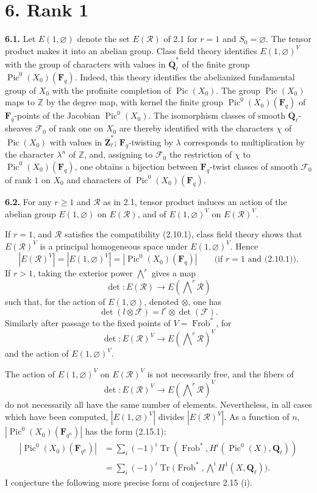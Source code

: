 \documentclass[11pt]{article}
\newcommand{\Fq}{\mathbf{F}_q}
\newcommand{\F}{\mathbf{F}}
\newcommand{\Qbl}{\overline{\mathbf{Q}}_{\ell}}
\newcommand{\Ql}{\mathbf{Q}_{\ell}}
\newcommand{\Zbl}{\overline{\mathbf{Z}}_{\ell}}
\newcommand{\Frob}{\operatorname{Frob}}
\newcommand{\Pic}{\operatorname{Pic}}
\newcommand{\Tr}{\operatorname{Tr}}
\newcommand{\Z}{\mathbb{Z}}
\newcommand{\para}[1]{\medskip\noindent\textbf{#1}\enspace}
\begin{document}
\section*{6. Rank 1}

\para{6.1.} Let \(E(1,\varnothing)\) denote the set \(E(\mathcal R)\) of 2.1 for \(r=1\) and \(S_0=\varnothing\). The tensor product makes it into an abelian group. Class field theory identifies \(E(1,\varnothing)^V\) with the group of characters with values in \(\Qbl^*\) of the finite group \(\Pic^0(X_0)(\Fq)\). Indeed, this theory identifies the abelianized fundamental group of \(X_0\) with the profinite completion of \(\Pic(X_0)\). The group \(\Pic(X_0)\) maps to \(\Z\) by the degree map, with kernel the finite group \(\Pic^0(X_0)(\Fq)\) of \(\Fq\)-points of the Jacobian \(\Pic^0(X_0)\). The isomorphism classes of smooth \(\Qbl\)-sheaves \(\mathcal F_0\) of rank one on \(X_0\) are thereby identified with the characters \(\chi\) of \(\Pic(X_0)\) with values in \(\Zbl^*\); \(\Fq\)-twisting by \(\lambda\) corresponds to multiplication by the character \(\lambda^n\) of \(\Z\), and, assigning to \(\mathcal F_0\) the restriction of \(\chi\) to \(\Pic^0(X_0)(\Fq)\), one obtains a bijection between \(\Fq\)-twist classes of smooth \(\mathcal F_0\) of rank \(1\) on \(X_0\) and characters of \(\Pic^0(X_0)(\Fq)\).

\para{6.2.} For any \(r\geq 1\) and \(\mathcal R\) as in 2.1, tensor product induces an action of the abelian group \(E(1,\varnothing)\) on \(E(\mathcal R)\), and of \(E(1,\varnothing)^V\) on \(E(\mathcal R)^V\).

If \(r=1\), and \(\mathcal R\) satisfies the compatibility (2.10.1), class field theory shows that \(E(\mathcal R)^V\) is a principal homogeneous space under \(E(1,\varnothing)^V\). Hence
\begin{equation}
  |E(\mathcal R)^V|=|E(1,\varnothing)^V|=|\Pic^0(X_0)(\Fq)| \qquad \text{(if \(r=1\) and (2.10.1)).}
\tag{6.2.1}
\end{equation}
If \(r>1\), taking the exterior power \(\bigwedge^r\) gives a map
\[
  \det:E(\mathcal R)\longrightarrow E(\bigwedge\nolimits^r\mathcal R)
\]
such that, for the action of \(E(1,\varnothing)\), denoted \(\otimes\), one has
\[
  \det(l\otimes\mathcal F)=l^r\otimes\det(\mathcal F).
\]
Similarly after passage to the fixed points of \(V=\Frob^*\), for
\[
  \det:E(\mathcal R)^V\longrightarrow E(\bigwedge\nolimits^r\mathcal R)^V
\]
and the action of \(E(1,\varnothing)^V\).

The action of \(E(1,\varnothing)^V\) on \(E(\mathcal R)^V\) is not necessarily free, and the fibers of
\[
  \det:E(\mathcal R)^V\longrightarrow E(\bigwedge\nolimits^r\mathcal R)^V
\]
do not necessarily all have the same number of elements. Nevertheless, in all cases which have been computed, \(|E(1,\varnothing)^V|\) divides \(|E(\mathcal R)^V|\). As a function of \(n\), \(|\Pic^0(X_0)(\F_{q^n})|\) has the form (2.15.1):
\[
\begin{aligned}
|\Pic^0(X_0)(\F_{q^n})|
&=\sum_i(-1)^i\Tr(\Frob^*,H^i(\Pic^0(X),\Ql))\\
&=\sum_i(-1)^i\Tr\bigl(\Frob^*,\bigwedge\nolimits^iH^1(X,\Ql)\bigr).
\end{aligned}
\]
I conjecture the following more precise form of conjecture 2.15 (i).
\end{document}
